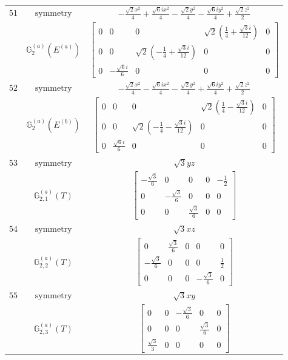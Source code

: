 \documentclass[fleqn,8pt,landscape]{jsarticle}
\begin{document}
\begin{longtable}{ccc}
$ 51 $ & $ \text{symmetry} $ & $ - \frac{\sqrt{2} x^{2}}{4} + \frac{\sqrt{6} i x^{2}}{4} - \frac{\sqrt{2} y^{2}}{4} - \frac{\sqrt{6} i y^{2}}{4} + \frac{\sqrt{2} z^{2}}{2} $ \\
$  $ & $ \mathbb{G}_{2}^{(a)}(E^{(a)}) $ & $ \begin{bmatrix} 0 & 0 & 0 & \sqrt{2} \left(\frac{1}{4} + \frac{\sqrt{3} i}{12}\right) & 0 \\ 0 & 0 & \sqrt{2} \left(- \frac{1}{4} + \frac{\sqrt{3} i}{12}\right) & 0 & 0 \\ 0 & - \frac{\sqrt{6} i}{6} & 0 & 0 & 0 \end{bmatrix} $ \\ \hline
$ 52 $ & $ \text{symmetry} $ & $ - \frac{\sqrt{2} x^{2}}{4} - \frac{\sqrt{6} i x^{2}}{4} - \frac{\sqrt{2} y^{2}}{4} + \frac{\sqrt{6} i y^{2}}{4} + \frac{\sqrt{2} z^{2}}{2} $ \\
$  $ & $ \mathbb{G}_{2}^{(a)}(E^{(b)}) $ & $ \begin{bmatrix} 0 & 0 & 0 & \sqrt{2} \left(\frac{1}{4} - \frac{\sqrt{3} i}{12}\right) & 0 \\ 0 & 0 & \sqrt{2} \left(- \frac{1}{4} - \frac{\sqrt{3} i}{12}\right) & 0 & 0 \\ 0 & \frac{\sqrt{6} i}{6} & 0 & 0 & 0 \end{bmatrix} $ \\ \hline
$ 53 $ & $ \text{symmetry} $ & $ \sqrt{3} y z $ \\
$  $ & $ \mathbb{G}_{2,1}^{(a)}(T) $ & $ \begin{bmatrix} - \frac{\sqrt{3}}{6} & 0 & 0 & 0 & - \frac{1}{2} \\ 0 & - \frac{\sqrt{3}}{6} & 0 & 0 & 0 \\ 0 & 0 & \frac{\sqrt{3}}{6} & 0 & 0 \end{bmatrix} $ \\ \hline
$ 54 $ & $ \text{symmetry} $ & $ \sqrt{3} x z $ \\
$  $ & $ \mathbb{G}_{2,2}^{(a)}(T) $ & $ \begin{bmatrix} 0 & \frac{\sqrt{3}}{6} & 0 & 0 & 0 \\ - \frac{\sqrt{3}}{6} & 0 & 0 & 0 & \frac{1}{2} \\ 0 & 0 & 0 & - \frac{\sqrt{3}}{6} & 0 \end{bmatrix} $ \\ \hline
$ 55 $ & $ \text{symmetry} $ & $ \sqrt{3} x y $ \\
$  $ & $ \mathbb{G}_{2,3}^{(a)}(T) $ & $ \begin{bmatrix} 0 & 0 & - \frac{\sqrt{3}}{6} & 0 & 0 \\ 0 & 0 & 0 & \frac{\sqrt{3}}{6} & 0 \\ \frac{\sqrt{3}}{3} & 0 & 0 & 0 & 0 \end{bmatrix} $ \\ \hline

\end{longtable}
\end{document}
